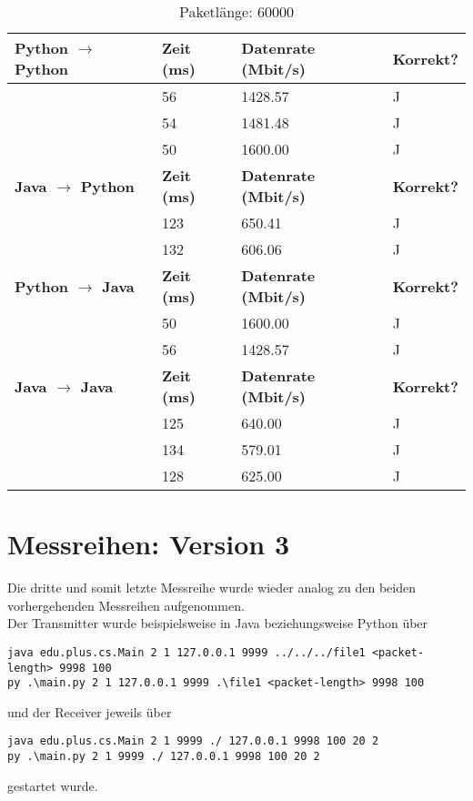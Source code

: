 \documentclass{article}
\begin{document}
    \begin{table}[]
        \caption{Paketlänge: 60000}
        \label{tab:my-tablev2_60000}
        \begin{tabular}{|l|l|l|l|}
            \hline
            \textbf{Python $\rightarrow$ Python} & \textbf{Zeit (ms)} & \textbf{Datenrate (Mbit/s)} & \textbf{Korrekt?} \\ \hline
            & 56       & 1428.57         & J        \\ \cline{2-4}
            & 54       & 1481.48         & J        \\ \cline{2-4}
            & 50       & 1600.00         & J        \\ \hline
            \textbf{Java $\rightarrow$ Python}   & \textbf{Zeit (ms)} & \textbf{Datenrate (Mbit/s)} & \textbf{Korrekt?} \\ \hline
            & 123      & 650.41          & J        \\ \cline{2-4}
            & 132      & 606.06          & J        \\ \hline
            \textbf{Python $\rightarrow$ Java}  & \textbf{Zeit (ms)} & \textbf{Datenrate (Mbit/s)} & \textbf{Korrekt?} \\ \hline
            & 50       & 1600.00         & J        \\ \cline{2-4}
            & 56       & 1428.57         & J        \\ \hline
            \textbf{Java $\rightarrow$ Java}   & \textbf{Zeit (ms)} & \textbf{Datenrate (Mbit/s)} & \textbf{Korrekt?} \\ \hline
            & 125      & 640.00          & J        \\ \cline{2-4}
            & 134      & 579.01          & J        \\ \cline{2-4}
            & 128      & 625.00          & J        \\ \hline
        \end{tabular}
    \end{table}

    \newpage

    \section{Messreihen: Version 3}
    Die dritte und somit letzte Messreihe wurde wieder analog zu den beiden vorhergehenden Messreihen aufgenommen.\\

    Der Transmitter wurde beispielsweise in Java beziehungsweise Python über
    \begin{lstlisting}
java edu.plus.cs.Main 2 1 127.0.0.1 9999 ../../../file1 <packet-length> 9998 100
py .\main.py 2 1 127.0.0.1 9999 .\file1 <packet-length> 9998 100
    \end{lstlisting}und der Receiver jeweils über
    \begin{lstlisting}
java edu.plus.cs.Main 2 1 9999 ./ 127.0.0.1 9998 100 20 2
py .\main.py 2 1 9999 ./ 127.0.0.1 9998 100 20 2
    \end{lstlisting}
    gestartet wurde.
\end{document}

